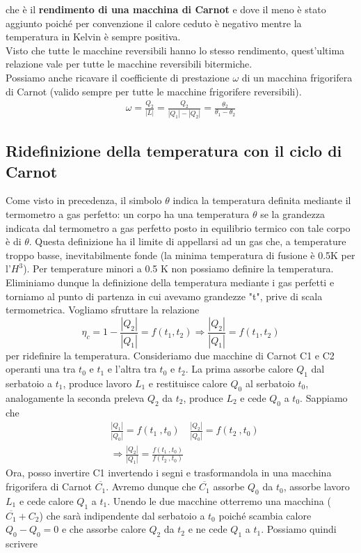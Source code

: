 \documentclass[
10pt, %
a4paper, %
oneside, %
headinclude,footinclude, %
BCOR5mm, %
]{scrartcl}
\begin{document}
che è il \textbf{rendimento di una macchina di Carnot} e dove il meno è stato aggiunto poiché per convenzione il calore ceduto è negativo mentre la temperatura in Kelvin è sempre positiva.\\
Visto che tutte le macchine reversibili hanno lo stesso rendimento, quest'ultima relazione vale per tutte le macchine reversibili bitermiche. \\
Possiamo anche ricavare il coefficiente di prestazione $\omega$ di un macchina frigorifera di Carnot (valido sempre per tutte le macchine frigorifere reversibili). 
\begin{align*}
	\omega = \frac{Q_2}{|L|} = \frac{Q_2}{|Q_1|-|Q_2|} = \frac{\theta_2}{\theta_1 - \theta_2}
\end{align*}

\subsection{Ridefinizione della temperatura con il ciclo di Carnot}
Come visto in precedenza, il simbolo $\theta$ indica la temperatura definita mediante il termometro a gas perfetto: un corpo ha una temperatura $\theta$ se la grandezza indicata dal termometro a gas perfetto posto in equilibrio termico con tale corpo è di $\theta$. Questa definizione ha il limite di appellarsi ad un gas che, a temperature troppo basse, inevitabilmente fonde (la minima temperatura di fusione è 0.5K per l'$H^3$). Per temperature minori a 0.5 K non possiamo definire la temperatura.\\
Eliminiamo dunque la definizione della temperatura mediante i gas perfetti e torniamo al punto di partenza in cui avevamo grandezze "t", prive di scala termometrica. Vogliamo sfruttare la relazione \[\eta_c = 1-\frac{|Q_2|}{|Q_1|}=f(t_1,t_2) \Rightarrow \frac{|Q_2|}{|Q_1|}=f(t_1,t_2)\]
per ridefinire la temperatura. Consideriamo due macchine di Carnot C1 e C2 operanti una tra $t_0$ e $t_1$ e l'altra tra $t_0$ e $t_2$. La prima assorbe calore \(Q_1\) dal serbatoio a \(t_1\), produce lavoro \( L_1\) e restituisce calore \(Q_0\) al serbatoio \(t_0\), analogamente la seconda preleva \(Q_2\) da \(t_2\), produce \(L_2\) e cede \(Q_0\) a \(t_0\). Sappiamo che
\begin{align*}
	&\frac{|Q_1|}{|Q_0|} =f(t_1\ , t_0) \quad \frac{|Q_2|}{|Q_0|} =f(t_2\ , t_0)\\
	&\Rightarrow \frac{|Q_2|}{|Q_1|} =\frac{f(t_1\ , t_0)}{f(t_2\ , t_0)}
\end{align*}
Ora, posso invertire C1 invertendo i segni e trasformandola in una macchina frigorifera di Carnot $\overline{C_1}$. Avremo dunque che $\overline{C_1}$ assorbe \(Q_0\) da \(t_0\), assorbe lavoro \(L_1\) e cede calore \(Q_1\) a \(t_1\). Unendo le due macchine otterremo una macchina ($\overline{C_1}+C_2$) che sarà indipendente dal serbatoio a \(t_0\) poiché scambia calore \(Q_0-Q_0 =  0\) e che assorbe calore \(Q_2\) da \(t_2\) e ne cede \(Q_1\) a \(t_1\). Possiamo quindi scrivere
\end{document}

